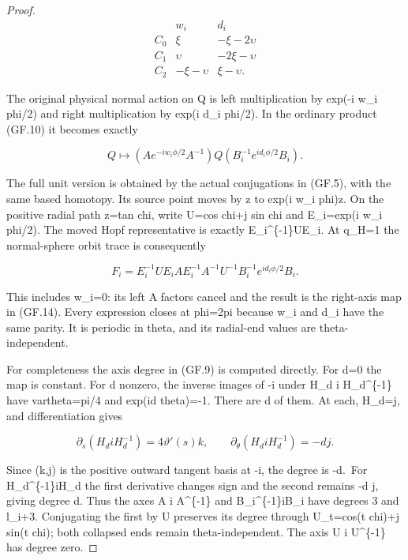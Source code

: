 \begin{proof}
\[
\begin{array}{c|rr}
 &w_i&d_i\\ \hline
 C_0&\xi&-\xi-2\upsilon\\
 C_1&\upsilon&-2\xi-\upsilon\\
 C_2&-\xi-\upsilon&\xi-\upsilon.
\end{array}                                                   \tag{GF.13}
\]

The original physical normal action on Q is left multiplication
by exp(-i w\_i phi/2) and right multiplication by exp(i d\_i phi/2).
In the ordinary product (GF.10) it becomes exactly

\[
 Q\longmapsto
 (A e^{-iw_i\phi/2}A^{-1})Q
                 (B_i^{-1}e^{id_i\phi/2}B_i).         \tag{GF.14}
\]

The full unit version is obtained by the actual conjugations in
(GF.5), with the same based homotopy. Its source point moves by
z to exp(i w\_i phi)z. On the positive radial path z=tan chi,
write U=cos chi+j sin chi and E\_i=exp(i w\_i phi/2). The moved
Hopf representative is exactly E\_i\^{}\{-1\}UE\_i. At q\_H=1 the
normal-sphere orbit trace is consequently

\[
 F_i=E_i^{-1}UE_i A E_i^{-1}A^{-1}U^{-1}
                       B_i^{-1}e^{id_i\phi/2}B_i.     \tag{GF.15}
\]

This includes w\_i=0: its left A factors cancel and the result is
the right-axis map in (GF.14). Every expression closes at phi=2pi
because w\_i and d\_i have the same parity. It is periodic in theta,
and its radial-end values are theta-independent.

For completeness the axis degree in (GF.9) is computed directly.
For d=0 the map is constant. For d nonzero, the inverse images
of -i under H\_d i H\_d\^{}\{-1\} have vartheta=pi/4 and exp(id theta)=-1.
There are \textbar d\textbar{} of them. At each, H\_d=j, and differentiation gives

\[
 \partial_s(H_diH_d^{-1})=4\vartheta'(s)k,\qquad
 \partial_\theta(H_diH_d^{-1})=-d j.
\]

Since (k,j) is the positive outward tangent basis at -i, the
degree is -d.~For H\_d\^{}\{-1\}iH\_d the first derivative changes
sign and the second remains -d j, giving degree d.
Thus the axes A i A\^{}\{-1\} and B\_i\^{}\{-1\}iB\_i have degrees
3 and l\_i+3. Conjugating the first by U preserves its degree
through U\_t=cos(t chi)+j sin(t chi); both collapsed ends remain
theta-independent. The axis U i U\^{}\{-1\} has degree zero.


\end{proof}
